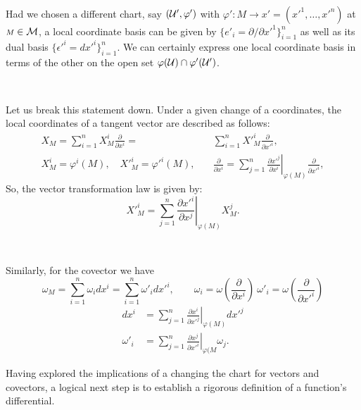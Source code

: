 \, 

Had we chosen a different chart, say  $(\mathcal{U}',\varphi')$ with $\varphi': {\scriptstyle M}\to  x'=({x'}^1,\dots,{x'}^n)$ at ${\scriptstyle M}\in \mathcal{M}$,  a local coordinate basis can be given by $ \{e'_{i}=\partial/\partial {x'}^{1}\}_{i=1}^{n}$ as well as its dual basis $ \{{\epsilon'}^{i}=d{x'}^{i}\}_{i=1}^{n}$. We can certainly express one local coordinate basis in terms of the other on the open set $\varphi(\mathcal{U})\cap\varphi'(\mathcal{U}')$.

\, 

Let us break this statement down. Under a given change of a coordinates, the local coordinates of a tangent vector are described as follows:  
\[\begin{aligned}
 X_{\scriptstyle M}= \sum_{i=1}^n X_{\scriptstyle M}^i \frac{\partial}{\partial x^{i}}=& \sum_{i=1}^n {X'}_{\scriptstyle M}^i \frac{\partial}{\partial {x'}^{i}},\\
X_{\scriptstyle M}^i=\varphi^i({\scriptstyle M}), \quad  {X'}_{\scriptstyle M}^i={\varphi'}^i({\scriptstyle M}),\quad 
&\frac{\partial}{\partial x^i}= \sum_{j=1}^n\left. \frac{\partial {x'}^j}{\partial {x}^i}\right|_{\varphi({\scriptstyle M})} \frac{\partial}{\partial {x'}^{i}},
\end{aligned}
 \]
So, the vector transformation law is given by: 
\begin{equation}
{X'}_{\scriptstyle M}^i= \sum_{j=1}^n\left. \frac{\partial {x'}^i}{\partial {x}^j}\right|_{\varphi({\scriptstyle M})} X_{\scriptstyle M}^j.
\end{equation}

\, 

Similarly, for the covector we have
\[ 
\omega_{\scriptstyle M}= \sum_{i=1}^n \omega_idx^{i}= \sum_{i=1}^n \omega'_i d{x'}^{i},\qquad  \omega_i= \omega\left(\frac{\partial}{\partial x^{i}}\right)\ \omega'_i= \omega\left(\frac{\partial}{\partial {x'}^{i}}\right)\]
\begin{equation}
\begin{aligned}\label{E:chartchange}
dx^{i}&= \sum_{j=1}^n\left. \frac{\partial {x}^i}{\partial {x'}^j}\right|_{\varphi({\scriptstyle M})} d{x'}^{j}\\
\omega'_{i}&= \sum_{j=1}^n\left. \frac{\partial {x}^j}{\partial {x'}^i}\right|_{\varphi({\scriptstyle M}} \omega_{j}.
\end{aligned}
\end{equation}

Having explored the implications of a changing the chart for vectors and covectors, a logical next step is to establish a rigorous definition of a function's differential.

